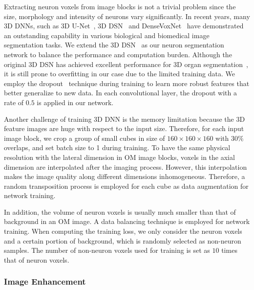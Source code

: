 Extracting neuron voxels from image blocks is not a trivial problem since the size, morphology and intensity of neurons vary significantly.
In recent years, many 3D DNNs, such as 3D U-Net~\cite{Cicek2016}, 3D DSN~\cite{Dou2017} and DenseVoxNet~\cite{Yu2017} have demonstrated an outstanding capability in various biological and biomedical image segmentation tasks.
We extend the 3D DSN~\cite{Dou2017} as our neuron segmentation network to balance the performance and computation burden.
%
Although the original 3D DSN has achieved excellent performance for 3D organ segmentation~\cite{Dou2017}, it is still prone to overfitting in our case due to the limited training data. 
We employ the dropout~\cite{Srivastava2014} technique during training to learn more robust features that better generalize to new data.
In each convolutional layer, the dropout with a rate of $0.5$ is applied in our network. 


Another challenge of training 3D DNN is the memory limitation because the 3D feature images are huge with respect to the input size. Therefore, for each input image block, we crop a group of small cubes in size of $160\times 160\times 160$ with $30\%$ overlaps, and set batch size to 1 during training. 
%
To have the same physical resolution with the lateral dimension in OM image blocks, voxels in the axial dimension are interpolated after the imaging process. However, this interpolation makes the image quality along different dimensions inhomogeneous. 
Therefore, a random transposition process is employed for each cube as data augmentation for network training.


In addition, the volume of neuron voxels is usually much smaller than that of background in an OM image.
A data balancing technique is employed for network training.
When computing the training loss, we only consider the neuron voxels and a certain portion of background, which is randomly selected as non-neuron samples.
The number of non-neuron voxels used for training is set as $10$ times that of neuron voxels.


\subsubsection{Image Enhancement}
\label{sec:enhancement}

